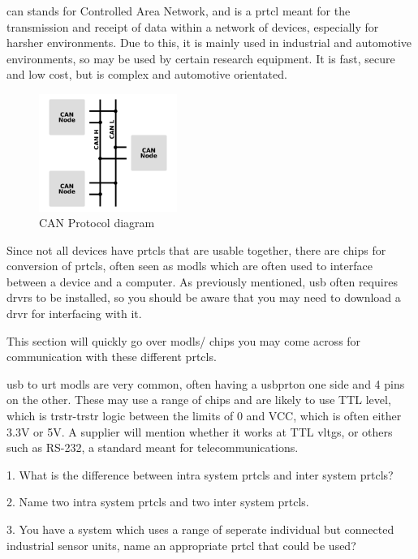 \documentclass[a4paper,11pt]{report}
\newcommand{\Quiz}[1] %
{
\par\noindent %
\phantomsection %
\todo[inline, color=blue!30]{\textbf{#1}} %
\vspace{1em} %
}
\begin{document}
\gls{can} stands for Controlled Area Network, and is a \gls{prtcl} meant for the transmission and receipt of data within a network of devices, especially for harsher environments. Due to this, it is mainly used in industrial and automotive environments, so may be used by certain research equipment. It is fast, secure and low cost, but is complex and automotive orientated.

\begin{figure}[H]
\centering
\includegraphics[width=0.4\textwidth]{CAN}
\caption{CAN Protocol diagram}
\end{figure}

Since not all devices have \gls{prtcl}s that are usable together, there are chips for conversion of \gls{prtcl}s, often seen as \gls{modl}s which are often used to interface between a device and a computer. As previously mentioned, \gls{usb} often requires \gls{drvr}s to be installed, so you should be aware that you may need to download a \gls{drvr} for interfacing with it.

This section will quickly go over \gls{modl}s/ chips you may come across for communication with these different \gls{prtcl}s.

\gls{usb} to \gls{urt} \gls{modl}s are very common, often having a \gls{usb}\gls{prt}on one side and 4 pins on the other. These may use a range of chips and are likely to use TTL level, which is \gls{trstr}-\gls{trstr} logic between the limits of 0 and VCC, which is often either 3.3V or 5V. A supplier will mention whether it works at TTL \gls{vltg}s, or others such as RS-232, a standard meant for telecommunications.

\Quiz{Quiz}

1. What is the difference between intra system \gls{prtcl}s and inter system \gls{prtcl}s?

2. Name two intra system \gls{prtcl}s and two inter system \gls{prtcl}s.

3. You have a system which uses a range of seperate individual but connected industrial sensor units, name an appropriate \gls{prtcl} that could be used?
\end{document}
